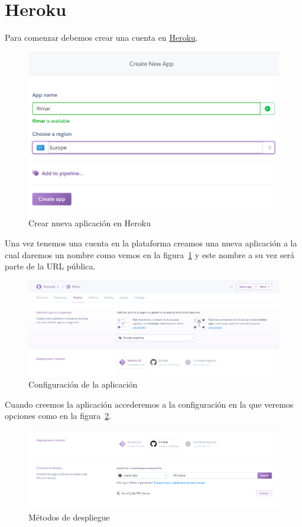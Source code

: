 \section{Heroku}
\label{makereference7.2}
Para comenzar debemos crear una cuenta en \href{https://www.heroku.com/}{Heroku}.
\begin{figure}[H]
    \centering
    \includegraphics[width=6in]{figures/chapter-4/heroku_1.png}
    \caption{Crear nueva aplicación en Heroku}
    \label{fig:heroku_1}
\end{figure}
Una vez tenemos una cuenta en la plataforma creamos una nueva aplicación a la cual daremos un nombre como vemos en la figura~\ref{fig:heroku_1} y este nombre a su vez será parte de la URL pública.
\begin{figure}[H]
    \centering
    \includegraphics[width=6in]{figures/chapter-4/heroku_2.png}
    \caption{Configuración de la aplicación}
    \label{fig:heroku_2}
\end{figure}
Cuando creemos la aplicación accederemos a la configuración en la que veremos opciones como en la figura~\ref{fig:heroku_2}.
\begin{figure}[H]
    \centering
    \includegraphics[width=6in]{figures/chapter-4/heroku_3.png}
    \caption{Métodos de despliegue}
    \label{fig:heroku_3}
\end{figure}

